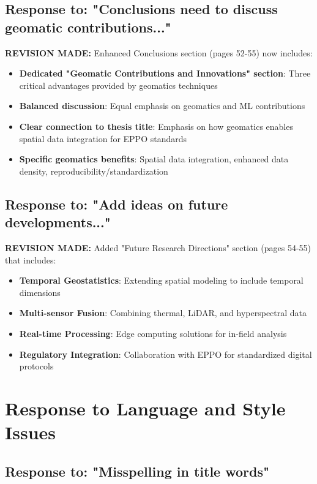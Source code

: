\documentclass[11pt,a4paper]{article}
\begin{document}
\subsection{Response to: "Conclusions need to discuss geomatic contributions..."}

\textbf{REVISION MADE:} Enhanced Conclusions section (pages 52-55) now includes:
\begin{itemize}
\item \textbf{Dedicated "Geomatic Contributions and Innovations" section}: Three critical advantages provided by geomatics techniques
\item \textbf{Balanced discussion}: Equal emphasis on geomatics and ML contributions
\item \textbf{Clear connection to thesis title}: Emphasis on how geomatics enables spatial data integration for EPPO standards
\item \textbf{Specific geomatics benefits}: Spatial data integration, enhanced data density, reproducibility/standardization
\end{itemize}

\subsection{Response to: "Add ideas on future developments..."}

\textbf{REVISION MADE:} Added "Future Research Directions" section (pages 54-55) that includes:
\begin{itemize}
\item \textbf{Temporal Geostatistics}: Extending spatial modeling to include temporal dimensions
\item \textbf{Multi-sensor Fusion}: Combining thermal, LiDAR, and hyperspectral data
\item \textbf{Real-time Processing}: Edge computing solutions for in-field analysis
\item \textbf{Regulatory Integration}: Collaboration with EPPO for standardized digital protocols
\end{itemize}

\section{Response to Language and Style Issues}

\subsection{Response to: "Misspelling in title words"}
\end{document}
